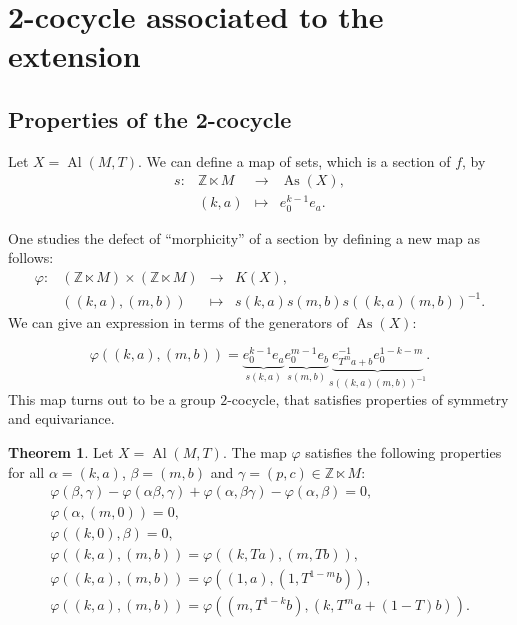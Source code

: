 \documentclass[a4paper,11pt]{amsart}
\theoremstyle{definition}
\newtheorem{thm}{Theorem}
\newcommand{\Z}{{\mathbb Z}}
\DeclareMathOperator{\Al}{Al}
\DeclareMathOperator{\As}{As}
\begin{document}
\section{2-cocycle associated to the extension}\label{sec:3}
\subsection{Properties of the 2-cocycle}
Let  $X=\Al(M,T)$.
We can define a map of sets, which is a section of $f$, by
\[\begin{array}{cccc}
s\colon & \Z \ltimes M & \longrightarrow & \As(X),\\
 & (k,a) & \longmapsto & e_0^{k-1} e_a.
\end{array}\]

One studies the defect of ``morphicity'' of a section by defining a new map as follows:
\[\begin{array}{cccc}
\varphi\colon &( \Z \ltimes M) \times (\Z \ltimes M) & \longrightarrow & K(X), \\
 & \left( (k, a), (m, b)\right) & \longmapsto & s(k, a) s(m,b) s((k, a)(m, b))^{-1}.
\end{array}\]
We can give an expression in terms of the generators of $\As(X)$:

\begin{equation}\label{defphi}
\varphi((k, a),(m, b)) = \underbrace{e_0^{k-1} e_a}_{s(k, a)} \underbrace{e_0^{m-1} e_b}_{s(m, b)} \underbrace{e^{-1}_{T^ma+b} e_0^{1-k-m}}_{s((k, a)(m, b))^{-1} }. 
\end{equation}
This map turns out to be a group $2$-cocycle, that satisfies properties of symmetry and equivariance.

\begin{thm}\label{thm:propphi}
Let $X=\Al(M,T)$.
The map $\varphi$ satisfies the following properties for all $\alpha = (k, a)$, $\beta=(m, b)$ and $\gamma = (p, c)\in \Z\ltimes M$:
\begin{align}
&\varphi(\beta,\gamma) - \varphi(\alpha \beta, \gamma) + \varphi(\alpha,\beta\gamma) - \varphi(\alpha, \beta)= 0, \label{conditioncocycle}&\\
& \varphi(\alpha,(m,0))= 0, \label{conditionnormalisationd} & \\
& \varphi((k,0),\beta)= 0, \label{conditionnormalisationg} & \\
& \varphi((k,a), (m,b)) = \varphi\left((k,T a), (m,T b)\right), &\label{invariance} \\
& \varphi\left( (k,a), (m,b) \right) = \varphi\left( (1,a),(1, T^{1-m}b) \right),\\
& \varphi\left( (k,a), (m,b) \right) = \varphi\left( (m, T^{1-k} b), (k, T^m a + (1-T) b) \right). &
\end{align}
\end{thm}
\end{document}
